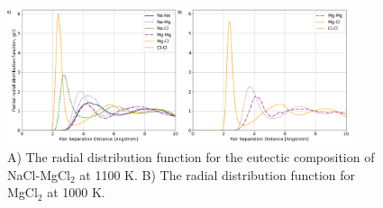 \documentclass[review]{elsarticle}
\providecommand{\DIFaddbegin}{\protect\color{blue}} %
\newcommand{\DIFaddincludegraphics}[2][]{{\color{blue}\fbox{\DIFOincludegraphics[#1]{#2}}}} %
\DeclareRobustCommand{\DIFaddbegin}{\DIFOaddbegin \let\includegraphics\DIFaddincludegraphics} %
\begin{document}
\begin{figure}[h]
 \centering
 \includegraphics[width=0.9\textwidth]{images/rdf_from_vasppy.png} 
 \caption{A) The radial distribution function for the eutectic composition of NaCl-MgCl$_2$ at 1100 K. B) The radial distribution function for MgCl$_2$ at 1000 K.}
 \label{fig:rdf}
\end{figure} 






\DIFaddbegin \FloatBarrier
\end{document}
